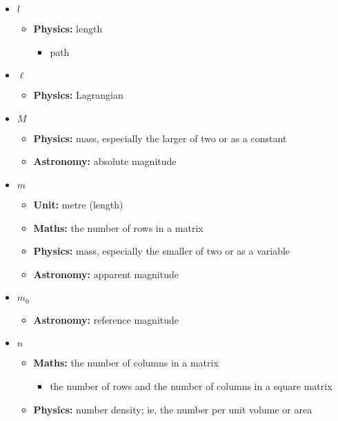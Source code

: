 \begin{itemize}
				\item $l$
				\begin{itemize}
					\item\textbf{Physics:} length
					\begin{itemize}
						\item path
					\end{itemize}
				\end{itemize}
				
				\item $\ell$
				\begin{itemize}
					\item\textbf{Physics:} Lagrangian
				\end{itemize}
				
				\item $M$
				\begin{itemize}
					\item\textbf{Physics:} mass, especially the larger of two or as a constant
					\item\textbf{Astronomy:} absolute magnitude
				\end{itemize}
				
				\item $m$
				\begin{itemize}
					\item\textbf{Unit:} metre (length)
					\item\textbf{Maths:} the number of rows in a matrix
					\item\textbf{Physics:} mass, especially the smaller of two or as a variable
					\item\textbf{Astronomy:} apparent magnitude
				\end{itemize}
				
				\item $m_0$
				\begin{itemize}
					\item \textbf{Astronomy:} reference magnitude
				\end{itemize}
				
				\item $n$
				\begin{itemize}
					\item\textbf{Maths:} the number of columns in a matrix
					\begin{itemize}
						\item the number of rows and the number of columns in a square matrix
					\end{itemize}
					\item\textbf{Physics:} number density; ie, the number per unit volume or area
				\end{itemize}
				

\end{itemize}
